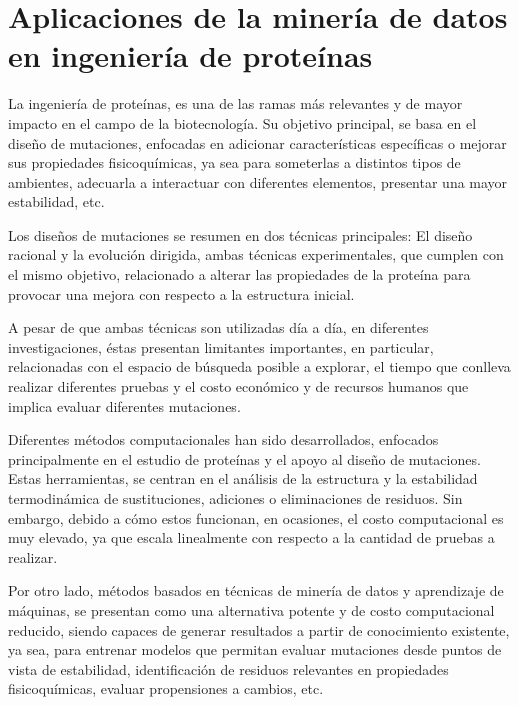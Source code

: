 
\chapter{Aplicaciones de la minería de datos en ingeniería de proteínas}  %

\ifpdf
    \graphicspath{{Chapter1/Figs/Raster/}{Chapter1/Figs/PDF/}{Chapter1/Figs/}}
\else
    \graphicspath{{Chapter1/Figs/Vector/}{Chapter1/Figs/}}
\fi

La ingeniería de proteínas, es una de las ramas más relevantes y de mayor impacto en el campo de la biotecnología. Su objetivo principal, se basa en el diseño de mutaciones, enfocadas en adicionar características específicas o mejorar sus propiedades fisicoquímicas, ya sea para someterlas a distintos tipos de ambientes, adecuarla a interactuar con diferentes elementos, presentar una mayor estabilidad, etc.

Los diseños de mutaciones se resumen en dos técnicas principales: El diseño racional y la evolución dirigida, ambas técnicas experimentales, que cumplen con el mismo objetivo, relacionado a alterar las propiedades de la proteína para provocar una mejora con respecto a la estructura inicial.

A pesar de que ambas técnicas son utilizadas día a día, en diferentes investigaciones, éstas presentan limitantes importantes, en particular, relacionadas con el espacio de búsqueda posible a explorar, el tiempo que conlleva realizar diferentes pruebas y el costo económico y de recursos humanos que implica evaluar diferentes mutaciones. 

Diferentes métodos computacionales han sido desarrollados, enfocados principalmente en el estudio de proteínas y el apoyo al diseño de mutaciones. Estas herramientas, se centran en el análisis de la estructura y la estabilidad termodinámica de sustituciones, adiciones o eliminaciones de residuos. Sin embargo, debido a cómo estos funcionan, en ocasiones, el costo computacional es muy elevado, ya que escala linealmente con respecto a la cantidad de pruebas a realizar. 

Por otro lado, métodos basados en técnicas de minería de datos y aprendizaje de máquinas, se presentan como una alternativa potente y de costo computacional reducido, siendo capaces de generar resultados a partir de conocimiento existente, ya sea, para entrenar modelos que permitan evaluar mutaciones desde puntos de vista de estabilidad, identificación de residuos relevantes en propiedades fisicoquímicas, evaluar propensiones a cambios, etc. 

